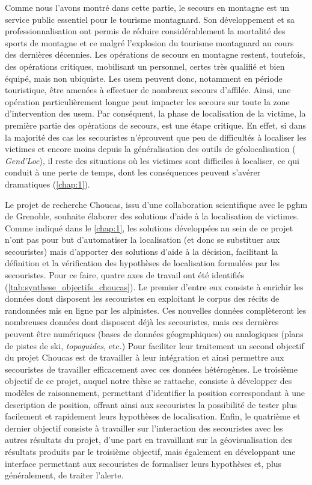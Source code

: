 Comme nous l'avons montré dans cette partie, le secours en montagne
est un service public essentiel pour le tourisme montagnard. Son
développement et sa professionnalisation ont permis de réduire
considérablement la mortalité des sports de montagne et ce malgré
l'explosion du tourisme montagnard au cours des dernières
décennies. Les opérations de secours en montagne restent, toutefois,
des opérations critiques, mobilisant un personnel, certes très
qualifié et bien équipé, mais non ubiquiste. Les \ac{usem} peuvent
donc, notamment en période touristique, être amenées à effectuer de
nombreux secours d'affilée. Ainsi, une opération particulièrement
longue peut impacter les secours sur toute la zone d'intervention des
\ac{usem}. Par conséquent, la phase de localisation de la victime, \ie
la première partie des opérations de secours, est une étape
critique. En effet, si dans la majorité des cas les secouristes
n'éprouvent que peu de difficultés à localiser les victimes et encore
moins depuis la généralisation des outils de géolocalisation (\eg
\emph{Gend'Loc}), il reste des situations où les victimes sont
difficiles à localiser, ce qui conduit à une perte de temps, dont les
conséquences peuvent s'avérer dramatiques (\autoref{chap:1}).

Le projet de recherche Choucas, issu d'une collaboration scientifique
avec le \ac{pghm} de Grenoble, souhaite élaborer des solutions d'aide
à la localisation de victimes. Comme indiqué dans le \autoref{chap:1},
les solutions développées au sein de ce projet n'ont pas pour but
d'automatiser la localisation (et donc se substituer aux secouristes)
mais d'apporter des solutions d'aide à la décision, facilitant la
définition et la vérification des hypothèses de localisation formulées
par les secouristes. Pour ce faire, quatre axes de travail ont été
identifiés (\autoref{tab:synthese_objectifs_choucas}). Le premier
d'entre eux consiste à enrichir les données dont disposent les
secouristes en exploitant le corpus des récits de randonnées mis en
ligne par les alpinistes. Ces nouvelles données complèteront les
nombreuses données dont disposent déjà les secouristes, mais ces
dernières peuvent être numériques (\eg bases de données géographiques)
ou analogiques (\eg plans de pistes de ski, \emph{topoguides,} etc.)
%
Pour faciliter leur traitement un second objectif du projet Choucas
est de travailler à leur intégration et ainsi permettre aux
secouristes de travailler efficacement avec ces données hétérogènes.
%
Le troisième objectif de ce projet, auquel notre thèse se rattache,
consiste à développer des modèles de raisonnement, permettant
d'identifier la position correspondant à une description de position,
offrant ainsi aux secouristes la possibilité de tester plus facilement
et rapidement leurs hypothèses de localisation.
%
Enfin, le quatrième et dernier objectif consiste à travailler sur
l'interaction des secouristes avec les autres résultats du projet,
d'une part en travaillant sur la géovisualisation des résultats
produits par le troisième objectif, mais également en développant une
interface permettant aux secouristes de formaliser leurs hypothèses
et, plus généralement, de traiter l'alerte.


